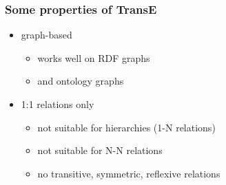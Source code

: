 \documentclass{beamer}
\begin{document}


\begin{frame}
  \frametitle{Some properties of TransE}
  \begin{itemize}
   
  \item graph-based
    \begin{itemize}
    \item works well on RDF graphs
    \item and ontology graphs
    \end{itemize}

    \pause
  \item 1:1 relations only
    \begin{itemize}
    \item not suitable for hierarchies (1-N relations)
    \item not suitable for N-N relations
    \item no transitive, symmetric, reflexive relations
    \end{itemize}
  \end{itemize}
\end{frame}
\end{document}
